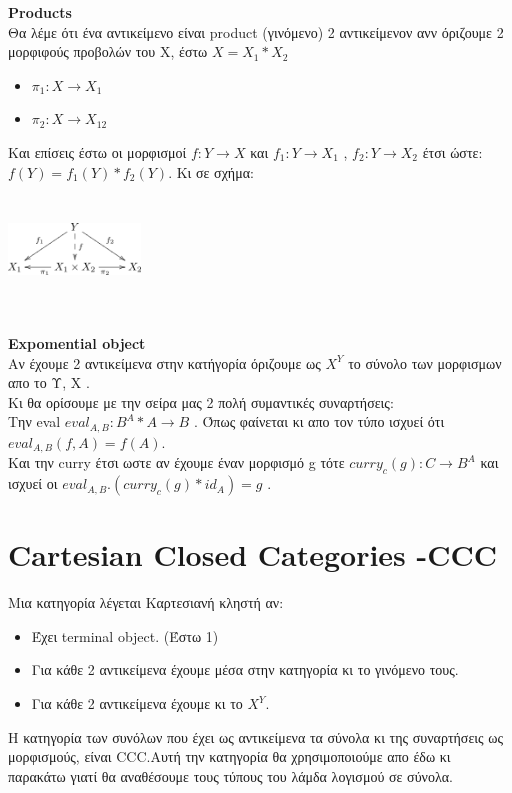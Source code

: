 \documentclass{article}
\begin{document}
\large{\textbf{Products}} \\
Θα λέμε ότι ένα αντικείμενο είναι product (γινόμενο) 2 αντικείμενον ανν όριζουμε 2 μορφιφούς προβολών του Χ, έστω $X=X_1*X_2$\begin{itemize}
	\item $\pi_1 : X\rightarrow X_1$ 
	\item $\pi_2 : X\rightarrow X_12$ 
	\end{itemize}
Και επίσεις έστω οι μορφισμοί $f: Y\rightarrow X$ και $f_1: Y\rightarrow X_1$ , $f_2: Y\rightarrow X_2$ έτσι ώστε: $f(Y)= f_1(Y)*f_2(Y)$. Κι σε σχήμα:
\\ \includegraphics[height=100pt,width=100pt]{product.png}

\large {\textbf{Expomential object}}\\
Αν έχουμε 2 αντικείμενα στην κατήγορία όριζουμε ως $X^Y$ το σύνολο των μορφισμων απο το Υ, Χ . 
\\Κι θα ορίσουμε με την σείρα μας 2 πολή συμαντικές συναρτήσεις:
\\Την eval $eval_{A,B}: B^A * A \rightarrow B$ . Όπως φαίνεται κι απο τον τύπο 
ισχυεί ότι $eval_{A,B}(f,A)=f(A)$.
\\ Και την curry έτσι ωστε αν έχουμε έναν μορφισμό g τότε $curry_c(g) : C\rightarrow B^A$ και ισχυεί οι $eval_{A,B}.(curry_c(g)*id_A)=g$ . 

\section*{Cartesian Closed Categories -CCC}

Μια κατηγορία λέγεται Καρτεσιανή κληστή αν:
\begin{itemize}
	\item Έχει terminal object. (Έστω 1)
 	\item Για κάθε 2 αντικείμενα έχουμε μέσα στην κατηγορία κι το γινόμενο τους.
	\item Για κάθε 2 αντικείμενα έχουμε κι το $X^Y$. 
	\end{itemize}
Η κατηγορία των συνόλων που έχει ως αντικείμενα τα σύνολα κι της συναρτήσεις ως μορφισμούς, είναι CCC.Αυτή την κατηγορία θα χρησιμοποιούμε απο έδω κι παρακάτω γιατί θα αναθέσουμε τους τύπους του λάμδα λογισμού σε σύνολα. 
 
\end{document}
